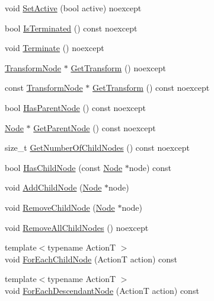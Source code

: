 \begin{DoxyCompactItemize}
\item 
void \hyperlink{classmage_1_1_node_af123050daa89e50f5468b630061aae53}{Set\+Active} (bool active) noexcept
\item 
bool \hyperlink{classmage_1_1_node_af669e446591ecb2d56b44769ba432172}{Is\+Terminated} () const noexcept
\item 
void \hyperlink{classmage_1_1_node_aa3dfb60e905aadef7537b1fb5bdc79e6}{Terminate} () noexcept
\item 
\hyperlink{classmage_1_1_transform_node}{Transform\+Node} $\ast$ \hyperlink{classmage_1_1_node_ab789d7674ed06d3e10114dd6d4b4334c}{Get\+Transform} () noexcept
\item 
const \hyperlink{classmage_1_1_transform_node}{Transform\+Node} $\ast$ \hyperlink{classmage_1_1_node_acbffccfec34313d8583546204c3d9fda}{Get\+Transform} () const noexcept
\item 
bool \hyperlink{classmage_1_1_node_acc47eb0f2eaa60e71fd945e79b4f622d}{Has\+Parent\+Node} () const noexcept
\item 
\hyperlink{classmage_1_1_node}{Node} $\ast$ \hyperlink{classmage_1_1_node_a21ba704ed3af4c80d096ad5f393da8e0}{Get\+Parent\+Node} () const noexcept
\item 
size\+\_\+t \hyperlink{classmage_1_1_node_ab4fff9779c09d873abcf881b6ff85d9e}{Get\+Number\+Of\+Child\+Nodes} () const noexcept
\item 
bool \hyperlink{classmage_1_1_node_a21ca020ee56a4fce4148c9902b97b2ec}{Has\+Child\+Node} (const \hyperlink{classmage_1_1_node}{Node} $\ast$node) const
\item 
void \hyperlink{classmage_1_1_node_a465b80fbebf01543c645603cfe3e1b7e}{Add\+Child\+Node} (\hyperlink{classmage_1_1_node}{Node} $\ast$node)
\item 
void \hyperlink{classmage_1_1_node_a3d94c7b67a5c35366a6915f0fc816802}{Remove\+Child\+Node} (\hyperlink{classmage_1_1_node}{Node} $\ast$node)
\item 
void \hyperlink{classmage_1_1_node_a7627e4e280fc9dd13d255c0f64eba79e}{Remove\+All\+Child\+Nodes} () noexcept
\item 
{\footnotesize template$<$typename ActionT $>$ }\\void \hyperlink{classmage_1_1_node_afedb523a462952ec29aed7504d0a71d4}{For\+Each\+Child\+Node} (ActionT action) const
\item 
{\footnotesize template$<$typename ActionT $>$ }\\void \hyperlink{classmage_1_1_node_a86668c371e1452204b52f2896cbb16fd}{For\+Each\+Descendant\+Node} (ActionT action) const
\end{DoxyCompactItemize}
